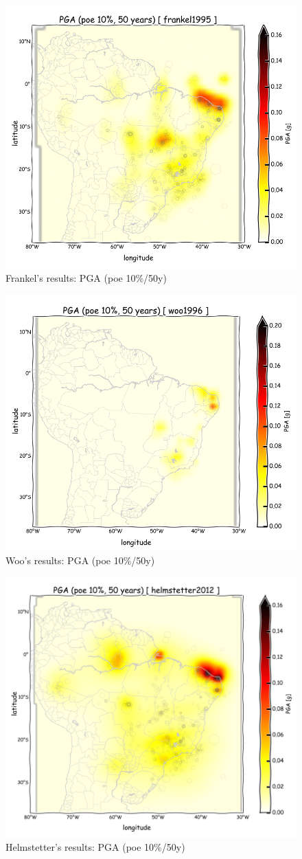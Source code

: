 \documentclass[draft, grl]{agutex}
\begin{document}
\begin{figure}
	\includegraphics[width=0.4\linewidth]{z_img_pga_frankel}
	\caption{Frankel's results: PGA (poe 10\%/50y)}
	\label{fig_pga_frankel}
\end{figure}


\begin{figure}
	\includegraphics[width=0.4\linewidth]{z_img_pga_woo}
	\caption{Woo's results: PGA (poe 10\%/50y)}
	\label{fig_pga_woo}
\end{figure}


\begin{figure}
	\includegraphics[width=0.4\linewidth]{z_img_pga_helmstetter}
	\caption{Helmstetter's results: PGA (poe 10\%/50y)}
	\label{fig_pga_helmstetter}
\end{figure}


\end{document}
